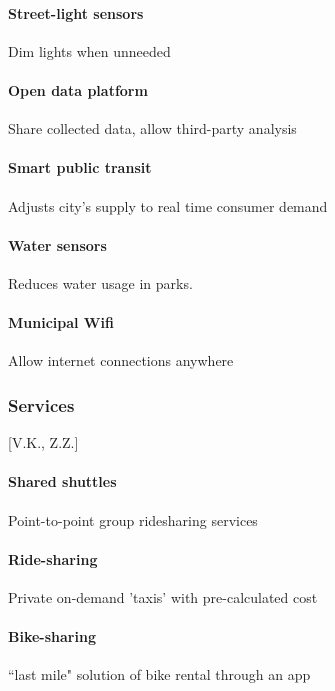 \documentclass[12pt]{article}                       %
\begin{document}
\paragraph{Street-light sensors} Dim lights when unneeded

\paragraph{Open data platform} Share collected data, allow third-party analysis

\paragraph{Smart public transit} Adjusts city's supply to real time consumer demand

\paragraph{Water sensors} Reduces water usage in parks.

\paragraph{Municipal Wifi} Allow internet connections anywhere


\subsubsection{Services}[V.K., Z.Z.]
\paragraph{Shared shuttles} Point-to-point group ridesharing services

\paragraph{Ride-sharing} Private on-demand 'taxis' with pre-calculated cost

\paragraph{Bike-sharing} “last mile" solution of bike rental through an app
\end{document}
